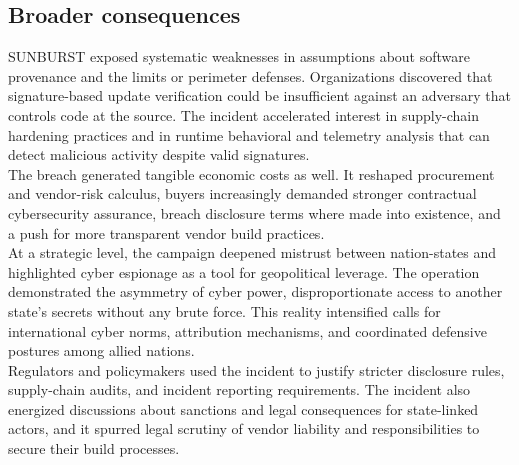 \documentclass[conference]{IEEEtran}
\begin{document}
\subsection{Broader consequences}
SUNBURST exposed systematic weaknesses in assumptions about software provenance and the limits or perimeter defenses. Organizations discovered
that signature-based update verification could be insufficient against an adversary that controls code at the source. The incident accelerated
interest in supply-chain hardening practices and in runtime behavioral and telemetry analysis that can detect malicious activity despite valid 
signatures.\\
The breach generated tangible economic costs as well. It reshaped procurement and vendor-risk calculus, buyers increasingly demanded stronger
contractual cybersecurity assurance, breach disclosure terms where made into existence, and a push for more transparent vendor build practices.\\
At a strategic level, the campaign deepened mistrust between nation-states and highlighted cyber espionage as a tool for geopolitical leverage.
The operation demonstrated the asymmetry of cyber power, disproportionate access to another state's secrets without any brute force. This reality
intensified calls for international cyber norms, attribution mechanisms, and coordinated defensive postures among allied nations.\\
Regulators and policymakers used the incident to justify stricter disclosure rules, supply-chain audits, and incident reporting requirements\cite{NCSC2021FurtherTTPsSVR}.
The incident also energized discussions about sanctions and legal consequences for state-linked actors, and it spurred legal scrutiny of vendor liability
and responsibilities to secure their build processes.
\end{document}
